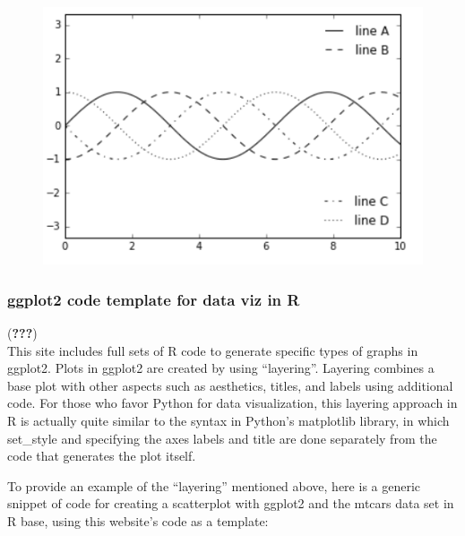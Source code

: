 \documentclass[]{book}
\begin{document}
\begin{figure}
\centering
\includegraphics{images/legend5.png}
\caption{}
\end{figure}

\subsubsection{ggplot2 code template for data viz in
R}\label{ggplot2-code-template-for-data-viz-in-r}

({\textbf{???}})\\
This site includes full sets of R code to generate specific types of
graphs in ggplot2. Plots in ggplot2 are created by using ``layering''.
Layering combines a base plot with other aspects such as aesthetics,
titles, and labels using additional code. For those who favor Python for
data visualization, this layering approach in R is actually quite
similar to the syntax in Python's matplotlib library, in which
set\_style and specifying the axes labels and title are done separately
from the code that generates the plot itself.

To provide an example of the ``layering'' mentioned above, here is a
generic snippet of code for creating a scatterplot with ggplot2 and the
mtcars data set in R base, using this website's code as a template:
\end{document}
